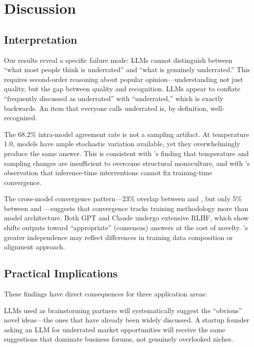 \section{Discussion}
\label{sec:discussion}

\subsection{Interpretation}

Our results reveal a specific failure mode: LLMs cannot distinguish between ``what most people think is underrated'' and ``what is genuinely underrated.'' This requires second-order reasoning about popular opinion---understanding not just quality, but the gap between quality and recognition. LLMs appear to conflate ``frequently discussed as underrated'' with ``underrated,'' which is exactly backwards. An item that everyone calls underrated is, by definition, well-recognized.

The 68.2\% intra-model agreement rate is not a sampling artifact. At temperature 1.0, models have ample stochastic variation available, yet they overwhelmingly produce the same answer. This is consistent with \citet{wu2024monoculture}'s finding that temperature and sampling changes are insufficient to overcome structural monoculture, and with \citet{correlated2025errors}'s observation that inference-time interventions cannot fix training-time convergence.

The cross-model convergence pattern---23\% overlap between \gptfour and \claude, but only 5\% between \gptfour and \llama---suggests that convergence tracks training methodology more than model architecture. Both GPT and Claude undergo extensive RLHF, which \citet{beyond2026divergent} show shifts outputs toward ``appropriate'' (consensus) answers at the cost of novelty. \llama's greater independence may reflect differences in training data composition or alignment approach.

\subsection{Practical Implications}

These findings have direct consequences for three application areas:

 LLMs used as brainstorming partners will systematically suggest the ``obvious'' novel ideas---the ones that have already been widely discussed. A startup founder asking an LLM for underrated market opportunities will receive the same suggestions that dominate business forums, not genuinely overlooked niches.

